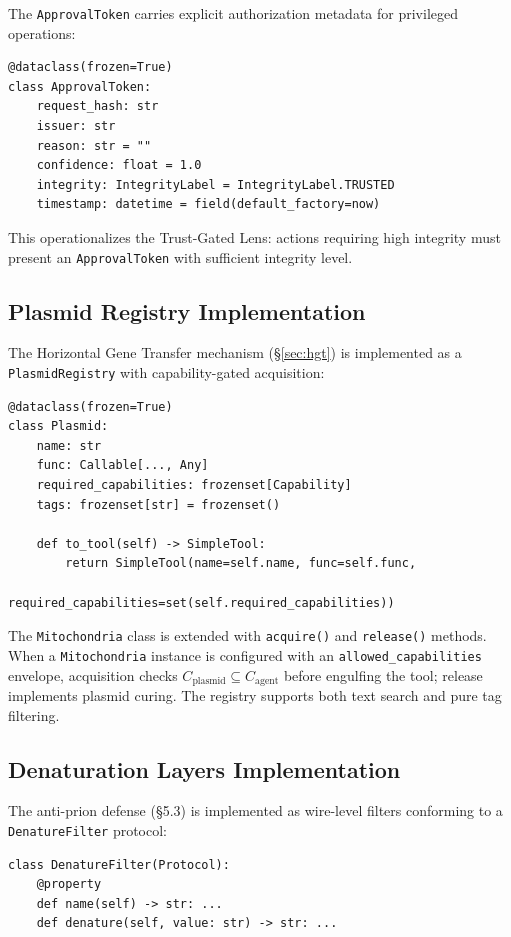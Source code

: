 The \texttt{ApprovalToken} carries explicit authorization metadata for privileged operations:

\begin{verbatim}
@dataclass(frozen=True)
class ApprovalToken:
    request_hash: str
    issuer: str
    reason: str = ""
    confidence: float = 1.0
    integrity: IntegrityLabel = IntegrityLabel.TRUSTED
    timestamp: datetime = field(default_factory=now)
\end{verbatim}

This operationalizes the Trust-Gated Lens: actions requiring high integrity must present an
\texttt{ApprovalToken} with sufficient integrity level.

\subsection{Plasmid Registry Implementation}

The Horizontal Gene Transfer mechanism (\S\ref{sec:hgt}) is implemented as a \texttt{PlasmidRegistry} with capability-gated acquisition:

\begin{verbatim}
@dataclass(frozen=True)
class Plasmid:
    name: str
    func: Callable[..., Any]
    required_capabilities: frozenset[Capability]
    tags: frozenset[str] = frozenset()

    def to_tool(self) -> SimpleTool:
        return SimpleTool(name=self.name, func=self.func,
                          required_capabilities=set(self.required_capabilities))
\end{verbatim}

The \texttt{Mitochondria} class is extended with \texttt{acquire()} and \texttt{release()} methods. When a \texttt{Mitochondria} instance is configured with an \texttt{allowed\_capabilities} envelope, acquisition checks $C_{\text{plasmid}} \subseteq C_{\text{agent}}$ before engulfing the tool; release implements plasmid curing. The registry supports both text search and pure tag filtering.

\subsection{Denaturation Layers Implementation}

The anti-prion defense (\S5.3) is implemented as wire-level filters conforming to a \texttt{DenatureFilter} protocol:

\begin{verbatim}
class DenatureFilter(Protocol):
    @property
    def name(self) -> str: ...
    def denature(self, value: str) -> str: ...
\end{verbatim}

